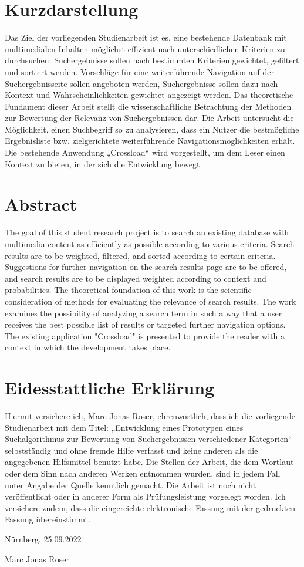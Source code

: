 \thispagestyle{empty}
\section*{Kurzdarstellung}
\label{sec:kurzdarstellung}
Das Ziel der vorliegenden Studienarbeit ist es, eine bestehende Datenbank mit multimedialen Inhalten möglichst effizient nach unterschiedlichen Kriterien zu durchsuchen.
Suchergebnisse sollen nach bestimmten Kriterien gewichtet, gefiltert und sortiert werden. Vorschläge für eine weiterführende Navigation auf der Suchergebnisseite sollen angeboten werden, Suchergebnisse sollen dazu nach Kontext und Wahrscheinlichkeiten gewichtet angezeigt werden.
Das theoretische Fundament dieser Arbeit stellt die wissenschaftliche Betrachtung der Methoden zur Bewertung der Relevanz von Suchergebnissen dar. Die Arbeit untersucht die Möglichkeit, einen Suchbegriff so zu analysieren, dass ein Nutzer die bestmögliche Ergebnisliste bzw. zielgerichtete weiterführende Navigationsmöglichkeiten erhält.
Die bestehende Anwendung „Crossload“ wird vorgestellt, um dem Leser einen Kontext zu bieten, in der sich die Entwicklung bewegt.

\section*{Abstract}
\label{sec:abstract}
The goal of this student research project is to search an existing database with multimedia content as efficiently as possible according to various criteria.
Search results are to be weighted, filtered, and sorted according to certain criteria. Suggestions for further navigation on the search results page are to be offered, and search results are to be displayed weighted according to context and probabilities.
The theoretical foundation of this work is the scientific consideration of methods for evaluating the relevance of search results. The work examines the possibility of analyzing a search term in such a way that a user receives the best possible list of results or targeted further navigation options.
The existing application "Crossload" is presented to provide the reader with a context in which the development takes place.

\clearpage
\section*{Eidesstattliche Erklärung}
\label{sec:explanation}
Hiermit versichere ich, Marc Jonas Roser, ehrenwörtlich, dass ich die vorliegende Studienarbeit mit dem Titel: „Entwicklung eines Prototypen eines Suchalgorithmus zur Bewertung von Suchergebnissen verschiedener Kategorien“ selbstständig und ohne fremde Hilfe verfasst und keine anderen als die angegebenen Hilfsmittel benutzt habe. Die Stellen der Arbeit, die dem Wortlaut oder dem Sinn nach anderen Werken entnommen wurden, sind in jedem Fall unter Angabe der Quelle kenntlich gemacht. Die Arbeit ist noch nicht veröffentlicht oder in anderer Form als Prüfungsleistung vorgelegt worden.
Ich versichere zudem, dass die eingereichte elektronische Fassung mit der gedruckten Fassung übereinstimmt.

Nürnberg, 25.09.2022

Marc Jonas Roser
